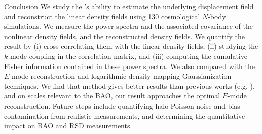 \begin{section}{Conclusion}
  \label{sec:conclusion}
  We study the 's ability to estimate the underlying displacement 
  field and reconstruct the linear density fields using 130 cosmological $N$-body 
  simulations.  We measure the power spectra and the associated covariance of the 
  nonlinear density fields, and the reconstructed density fields.  We quantify the 
  result by (i) cross-correlating them with the linear density fields, (ii) studying 
  the $k$-mode coupling in the correlation matrix, and (iii) computing the cumulative 
  Fisher information contained in these power spectra.  We also
  compared with the $E$-mode 
  reconstruction and logarithmic density mapping Gaussianization
  techniques.
We find that  method gives better results than previous works
  (e.g. \citealt{bib:Mark2009,bib:Zhang2011,bib:HarnoisD2013}), and on scales 
  relevant to the BAO, our result approaches the optimal $E$-mode reconstruction.  
  Future steps include quantifying halo Poisson noise and bias contamination 
  from realistic measurements, and determining the quantitative impact on
  BAO and RSD measurements.  

\end{section}
